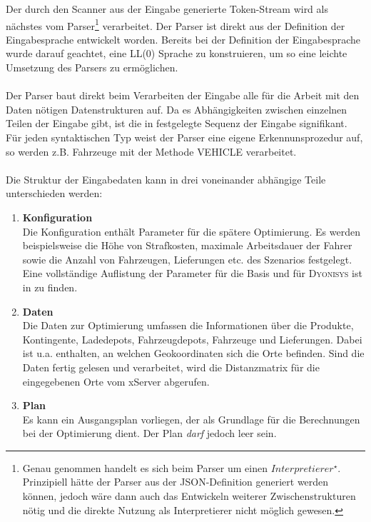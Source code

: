 \noindent
Der durch den Scanner aus der Eingabe generierte Token-Stream wird als nächstes vom Parser\footnote{Genau genommen handelt es sich beim Parser um einen $Interpretierer^\star$. Prinzipiell hätte der Parser aus der \textsc{JSON}-Definition generiert werden können, jedoch wäre dann auch das Entwickeln weiterer Zwischenstrukturen nötig und die direkte Nutzung als Interpretierer nicht möglich gewesen.} verarbeitet. Der Parser ist direkt aus der Definition der Eingabesprache entwickelt worden. Bereits bei der Definition der Eingabesprache wurde darauf geachtet, eine \textsc{LL(0)} Sprache zu konstruieren, um so eine leichte Umsetzung des Parsers zu ermöglichen. \\
\\
Der Parser baut direkt beim Verarbeiten der Eingabe alle für die Arbeit mit den Daten nötigen Datenstrukturen auf. Da es Abhängigkeiten zwischen einzelnen Teilen der Eingabe gibt, ist die in  festgelegte Sequenz der Eingabe signifikant. Für jeden syntaktischen Typ weist der Parser eine eigene Erkennunsprozedur auf, so werden z.B. Fahrzeuge mit der Methode \textsf{VEHICLE} verarbeitet. \\
\\
Die Struktur der Eingabedaten kann in drei voneinander abhängige Teile unterschieden werden:
\begin{enumerate}
  \item \textbf{Konfiguration} \\
    Die Konfiguration enthält Parameter für die spätere Optimierung. Es werden beispielsweise die Höhe von Strafkosten, maximale Arbeitsdauer der Fahrer sowie die Anzahl von Fahrzeugen, Lieferungen etc. des Szenarios festgelegt. Eine vollständige Auflistung der Parameter für die Basis und für \textsc{Dyonisys} ist in  zu finden.
  \item \textbf{Daten} \\
    Die Daten zur Optimierung umfassen die Informationen über die Produkte, Kontingente, Ladedepots, Fahrzeugdepots, Fahrzeuge und Lieferungen. Dabei ist u.a. enthalten, an welchen Geokoordinaten sich die Orte befinden. Sind die Daten fertig gelesen und verarbeitet, wird die Distanzmatrix für die eingegebenen Orte vom xServer abgerufen.
  \item \textbf{Plan} \\
    Es kann ein Ausgangsplan vorliegen, der als Grundlage für die Berechnungen bei der Optimierung dient. Der Plan \emph{darf} jedoch leer sein.
\end{enumerate}


